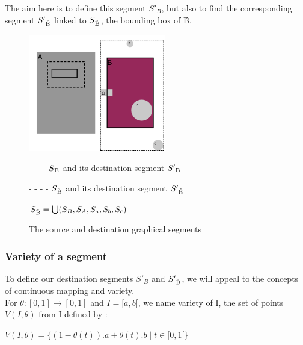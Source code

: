 \documentclass[a4paper]{article}
\begin{document}
The aim here is to define this segment $S'_B$, but also to find the corresponding segment $S'\textsubscript{\r{B}}$ linked to $S\textsubscript{\r{B}}$, the bounding box of \r{B}.

\begin{figure}[h]

\begin{multicols}{2}

\includegraphics[width=6cm]{img/exemple3.png}   	            

\columnbreak

 ------  $S\textsubscript{B}$ and its destination segment $S'\textsubscript{B}$

\bigskip

 - - - -  $S\textsubscript{\r{B}}$ and its destination segment $S'\textsubscript{\r{B}}$

\bigskip

 $S\textsubscript{\r{B}} = \bigcup(S_B, S_A, S_a, S_b, S_c) $

\end{multicols}
\caption{The source and destination graphical segments}
\label{fig:sync}
\end{figure}


\subsubsection{Variety of a segment}\label{subsubsec:variety}

To define our destination segments $S'_B$ and $S'\textsubscript{\r{B}}$, we will appeal to the concepts of continuous mapping and variety.
\\

For $\theta : [0,1] \rightarrow [0,1]$ and $I = [a,b[$, we name variety of I, the set of points $V(I,\theta)$ from I defined by :
\begin{center}
$V(I, \theta) =  \lbrace (1 - \theta(t)).a + \theta(t).b \mid t \in [0, 1[ \rbrace$ 
\end{center}
\end{document}
